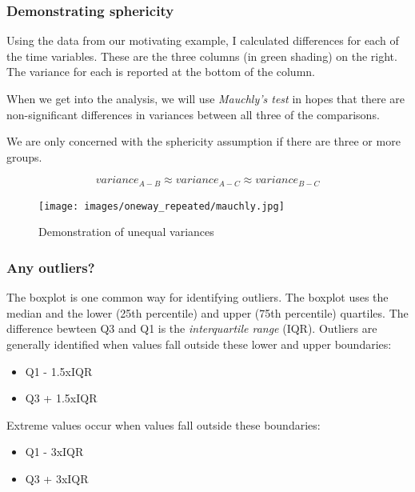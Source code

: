 \documentclass[
  11pt,
]{book}
\providecommand{\tightlist}{%
  \setlength{\itemsep}{0pt}\setlength{\parskip}{0pt}}
\begin{document}
\hypertarget{demonstrating-sphericity}{%
\subsubsection{Demonstrating sphericity}\label{demonstrating-sphericity}}

Using the data from our motivating example, I calculated differences for each of the time variables. These are the three columns (in green shading) on the right. The variance for each is reported at the bottom of the column.

When we get into the analysis, we will use \emph{Mauchly's test} in hopes that there are non-significant differences in variances between all three of the comparisons.

We are only concerned with the sphericity assumption if there are three or more groups.

\[variance_{A-B} \approx variance_{A-C}\approx variance_{B-C}\]

\begin{figure}
\hypertarget{id}{%
\centering
\texttt{[image: images/oneway\_repeated/mauchly.jpg]}
\caption{Demonstration of unequal variances}\label{id}
}
\end{figure}

\hypertarget{any-outliers}{%
\subsubsection{Any outliers?}\label{any-outliers}}

The boxplot is one common way for identifying outliers. The boxplot uses the median and the lower (25th percentile) and upper (75th percentile) quartiles. The difference bewteen Q3 and Q1 is the \emph{interquartile range} (IQR). Outliers are generally identified when values fall outside these lower and upper boundaries:

\begin{itemize}
\tightlist
\item
  Q1 - 1.5xIQR
\item
  Q3 + 1.5xIQR
\end{itemize}

Extreme values occur when values fall outside these boundaries:

\begin{itemize}
\tightlist
\item
  Q1 - 3xIQR
\item
  Q3 + 3xIQR
\end{itemize}
\end{document}
